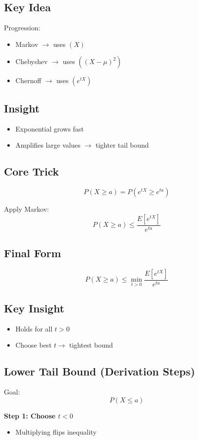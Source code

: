 \documentclass[11pt]{article}
\begin{document}
\subsection*{Key Idea}
Progression:
\begin{itemize}
\item Markov $\rightarrow$ uses $(X)$
\item Chebyshev $\rightarrow$ uses $((X-\mu)^2)$
\item Chernoff $\rightarrow$ uses $(e^{tX})$
\end{itemize}

\subsection*{Insight}
\begin{itemize}
\item Exponential grows fast
\item Amplifies large values $\rightarrow$ tighter tail bound
\end{itemize}

\subsection*{Core Trick}
\[
P(X \ge a) = P(e^{tX} \ge e^{ta})
\]

Apply Markov:
\[
P(X \ge a) \le \frac{E[e^{tX}]}{e^{ta}}
\]

\subsection*{Final Form}
\[
P(X \ge a) \le \min_{t>0} \frac{E[e^{tX}]}{e^{ta}}
\]

\subsection*{Key Insight}
\begin{itemize}
\item Holds for all $t > 0$
\item Choose best $t \rightarrow$ tightest bound
\end{itemize}

\subsection*{Lower Tail Bound (Derivation Steps)}

Goal:
\[
P(X \le a)
\]

\textbf{Step 1: Choose $t < 0$}
\begin{itemize}
\item Multiplying flips inequality
\end{itemize}
\end{document}
